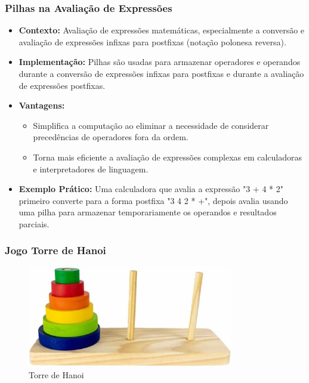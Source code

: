 \begin{frame}[fragile]
  \frametitle{Pilhas na Avaliação de Expressões}
  \begin{itemize}
    \item \textbf{Contexto:} Avaliação de expressões matemáticas, especialmente a conversão e avaliação de expressões infixas para postfixas (notação polonesa reversa).
    \item \textbf{Implementação:} Pilhas são usadas para armazenar operadores e operandos durante a conversão de expressões infixas para postfixas e durante a avaliação de expressões postfixas.
    \item \textbf{Vantagens:}
      \begin{itemize}
        \item Simplifica a computação ao eliminar a necessidade de considerar precedências de operadores fora da ordem.
        \item Torna mais eficiente a avaliação de expressões complexas em calculadoras e interpretadores de linguagem.
      \end{itemize}
    \item \textbf{Exemplo Prático:} Uma calculadora que avalia a expressão "3 + 4 * 2" primeiro converte para a forma postfixa "3 4 2 * +", depois avalia usando uma pilha para armazenar temporariamente os operandos e resultados parciais.
  \end{itemize}
\end{frame}
\begin{frame}[fragile]
  \frametitle{Jogo Torre de Hanoi}
  \begin{figure}
    \centering
    \includegraphics[width=0.8\textwidth]{assets/aula4-hanoi.jpg}
    \caption{Torre de Hanoi}
  \end{figure}
\end{frame}
